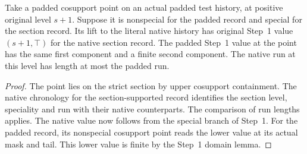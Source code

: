 \begin{theorem}
\label{hir:g1-positive-normal-native-special-values}
\leanok
Take a padded cosupport point on an actual padded test history, at
positive original level $s+1$. Suppose it is nonspecial for the
padded record and special for the section record. Its lift to the
literal native history has original Step~1 value $(s+1,\top)$
for the native section record. The padded Step~1 value at the point
has the same first component and a finite second component. The
native run at this level has length at most the padded run.
\end{theorem}
\begin{proof}
The point lies on the strict section by upper cosupport containment.
The native chronology for the section-supported record identifies the
section level, speciality and run with their native counterparts.
The comparison of run lengths applies. The native value now follows
from the special branch of Step~1. For the padded record, its
nonspecial cosupport point reads the lower value at its actual mask
and tail. This lower value is finite by the Step~1 domain lemma.
\end{proof}


